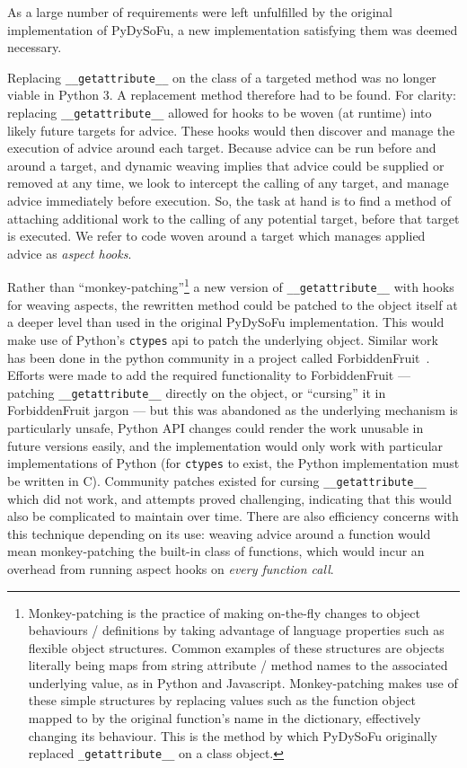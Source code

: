 As a large number of requirements were left unfulfilled by the original
implementation of PyDySoFu, a new implementation satisfying them was deemed
necessary.



Replacing \lstinline{__getattribute__} on the class of a targeted method was no
longer viable in Python 3. A replacement method therefore had to be found. For
clarity: replacing \lstinline{__getattribute__} allowed for hooks to be woven
(at runtime) into likely future targets for advice. These hooks would then
discover and manage the execution of advice around each target. Because advice
can be run before and around a target, and dynamic weaving implies that advice
could be supplied or removed at any time, we look to intercept the calling of
any target, and manage advice immediately before execution. So, the task at
hand is to find a method of attaching additional work to the calling of any
potential target, before that target is executed. We refer to code woven
around a target which manages applied advice as \emph{aspect hooks}.



Rather than ``monkey-patching''\footnote{Monkey-patching is the practice of making on-the-fly changes to object
behaviours / definitions by taking advantage of language properties such as
flexible object structures. Common examples of these structures are objects literally being maps from string
attribute / method names to the associated underlying value, as in Python and Javascript. Monkey-patching
makes use of these simple structures by replacing
values such as the function object mapped to by the original function's name in
the dictionary, effectively changing its behaviour. This is the method by which PyDySoFu originally replaced
\lstinline{_getattribute__} on a class object.} a new version of
\lstinline{__getattribute__} with hooks for weaving aspects, the rewritten
method could be patched to the object itself at a deeper level than used in the
original PyDySoFu implementation. This would make use of Python's
\lstinline{ctypes} api to patch the underlying object. Similar work has been
done in the python community in a project called
ForbiddenFruit~\cite{forbiddenfruit_repo}. Efforts were made to add the required
functionality to ForbiddenFruit --- patching \lstinline{__getattribute__}
directly on the object, or ``cursing'' it in ForbiddenFruit jargon --- but this
was abandoned as the underlying mechanism is particularly unsafe, Python API
changes could render the work unusable in future versions easily, and the
implementation would only work with particular implementations of Python (for
\lstinline{ctypes} to exist, the Python implementation must be written in C).
Community patches existed for cursing \lstinline{__getattribute__} which did not
work, and attempts proved challenging, indicating that this would also be
complicated to maintain over time. There are also efficiency concerns with this
technique depending on its use: weaving advice around a function would mean
monkey-patching the built-in class of functions, which would incur an overhead
from running aspect hooks on \emph{every function call}.

